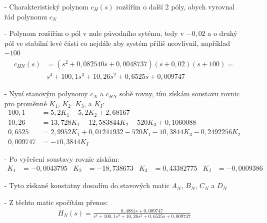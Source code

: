 \documentclass{article}
\begin{document}
\begin{itemize}
    \item[-] Charakteristický polynom $c_H(s)$ rozšířím o další 2 póly, abych vyrovnal řád polynomu $c_N$
    \item[-] Polynom rozšířím o pól v nule původního sytému, tedy v $-0,02$ a o druhý pól ve stabilní levé části co nejdále aby systém příliš neovlivnil, například $-100$
    \begin{align*}
        c_{HN}(s) &= (s^2+0,082540s+0,0048737)(s+0,02)(s+100) =\\ 
        &s^4+100,1s^3+10,26s^2+0,6525s+0,009747
    \end{align*}

    \item[-] Nyní stanovým polynomy $c_{N}$ a $c_{HN}$ sobě rovny, tím získám soustavu rovnic pro proměnné $K_1$, $K_2$. $K_3$, a $K_I$:
    \begin{align*}
        100,1 &= 5,2K_1-5,2K_2+2,68167\\
        10,26 &= 13,728K_1-12,583844K_2-520K_3+0,1060088\\
        0,6525 &= 2,9952K_1+0,01241932-520K_I-10,3844K_3-0,2492256K_2\\
        0,009747 &= -10,3844K_I
    \end{align*}
    \item[-] Po vyřešení soustavy rovnic získám: 
    \begin{align*}
        K_1 &= -0,0043795 &
        K_2 &= -18,738673 &
        K_3 &= 0,43382775 &
        K_I &= -0,0009386
    \end{align*}

    \item[-] Tyto získané konstatny dosadím do stavových matic $A_N$, $B_N$, $C_N$ a $D_N$
    \item[-] Z těchto matic spočítám přenos:
    \begin{align*}
        H_N(s) = \frac{0,4881s + 0,009747}{s^4+100,1s^3+10,26s^2+0,6525s+0,009747}
    \end{align*}


\end{itemize}
\end{document}
